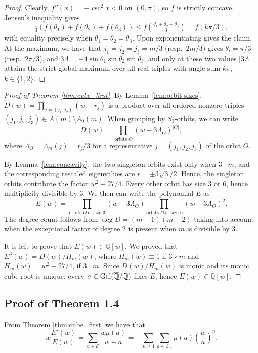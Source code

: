 \documentclass[11pt,reqno]{amsart}
\theoremstyle{remark}
\begin{document}
\begin{proof} Clearly,
$f''(x)=-\csc^2x<0$ on $(0,\pi)$, so $f$ is strictly concave. Jensen's
inequality gives
$$
\tfrac13(f(\theta_1)+f(\theta_2)+f(\theta_3))\le f(\tfrac{\theta_1+\theta_2+\theta_3}{3})=f(k\pi/3),
$$
with equality precisely when $\theta_1=\theta_2=\theta_3$.  Upon exponentiating gives the
claim. At the maximum, we have that $j_1=j_2=j_3=m/3$ (resp.\ $2m/3$) gives $\theta_i=\pi/3$
(resp.\ $2\pi/3$), and $3\Lambda=-4\sin\theta_1\sin\theta_2\sin\theta_3$, and only at these two values
$|3\Lambda|$ attains the strict global maximum over all real
triples with angle sum $k\pi$, $k\in\{1,2\}$.
\end{proof}

\begin{proof}[Proof of Theorem \ref{thm:cube_first}]
By Lemma~\ref{lem:orbit-sizes}, $D(w)=\prod_{j=(j_1,j_2)}(w-r_j)$ is a product over all
ordered nonzero triples $(j_1,j_2,j_3)\in A(m)\setminus A_0(m)$.  When grouping by $S_3$-orbits,
we can write
$$
D(w)=\prod_{\text{orbits }O}(w-3\Lambda_O)^{|O|},
$$
where $\Lambda_O=\Lambda_{m}(j)=r_j/3$ for a representative $j=(j_1,j_2,j_3)$ of the orbit $O$.

By Lemma~\ref{lem:concavity}, the two singleton orbits exist only when
$3\mid m$, and the corresponding rescaled eigenvalues are $r=\pm 3\sqrt{3}/2$. Hence, the singleton orbits contribute the factor $w^2-27/4$.
Every other orbit has size $3$ or $6$,
hence multiplicity divisible by $3$. We then can write the polynomial $E$ as
$$
E(w)=\prod_{\text{orbits }O  \, \text{of size $3$}}(w-3\Lambda_O) \prod_{\text{orbits }O  \, \text{of size $6$}}(w-3\Lambda_O)^{2}.
$$
The degree count follows from $\deg D=(m-1)(m-2)$ taking
into account when the exceptional factor of degree $2$ is present when $m$ is divisible by $3$.

It is left to prove that $E(w)\in\mathbb Q[w]$. We proved that $E^3(w)=D(w)/H_m(w)$, where $H_m(w)\equiv 1$ if $3\nmid m$ and $H_m(w)=w^2-27/4$, if $3\mid m$. Since $D(w)/H_m(w)$ is monic and its monic cube root is unique, every $\sigma\in{\rm Gal}(\overline{\mathbb Q} / \mathbb Q)$ fixes $E$, hence $E(w)\in\mathbb Q[w]$.
\end{proof}

\subsection{Proof of Theorem 1.4}

From Theorem \ref{thm:cube_first} we have that
$$
w\frac{E'(w)}{E(w)}=\sum_{a\in\mathcal E}\frac{w\mu(a)}{w-a}=-\sum_{n\geq 1}\sum_{a\in\mathcal E_m}\mu(a)\left(\frac{w}{a}\right)^n.
$$
\end{document}
